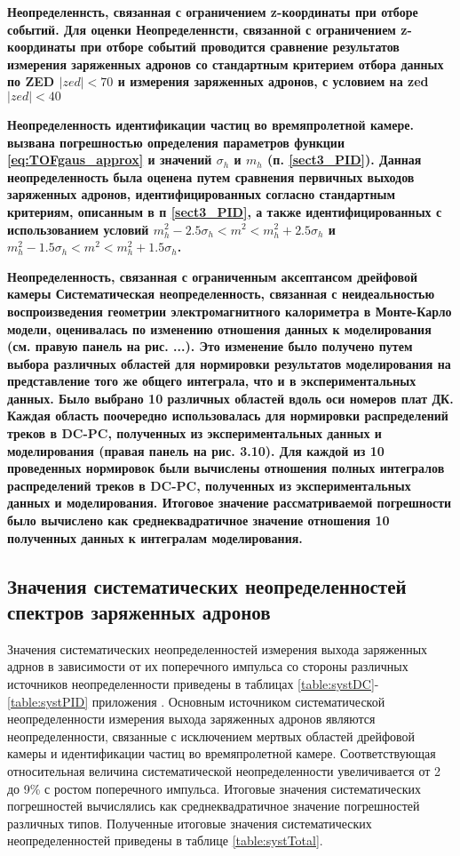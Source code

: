 \bfseries Неопределеннсть, связанная с ограничением z-координаты при отборе событий. 
\mdseries
Для оценки Неопределеннсти, связанной с ограничением z-координаты при отборе событий проводится сравнение результатов измерения заряженных адронов со стандартным критерием отбора данных по ZED $|zed|<70$ и измерения заряженных адронов, с условием на zed $|zed|<40$ 

\bfseries Неопределенность идентификации частиц во времяпролетной камере.
\mdseries
вызвана погрешностью определения параметров функции \ref{eq:TOFgaus_approx} и значений  $\sigma_h$ и $m_h$ (п. \ref{sect3_PID}). Данная неопределенность была оценена путем сравнения первичных выходов заряженных адронов, идентифицированных согласно стандартным критериям, описанным в п \ref{sect3_PID}, а также идентифицированных с использованием условий $ m^2_h -2.5\sigma_h < m^2 < m^2_h +2.5\sigma_h $ и  $ m^2_h -1.5\sigma_h < m^2 < m^2_h +1.5\sigma_h $.

\bfseries Неопределенность, связанная с ограниченным аксептансом дрейфовой камеры
\mdseries
Систематическая неопределенность, связанная с неидеальностью воспроизведения геометрии электромагнитного калориметра в Монте-Карло модели, оценивалась по изменению отношения данных к моделирования (см. правую панель на рис. ...). Это изменение было получено путем выбора различных областей для нормировки результатов моделирования на представление того же
общего интеграла, что и в экспериментальных данных. Было выбрано 10 различных областей вдоль оси номеров плат ДК. Каждая область поочередно использовалась для нормировки распределений треков в DC-PC, полученных из экспериментальных данных и моделирования (правая панель на рис. 3.10). Для каждой из 10 проведенных нормировок были вычислены отношения полных интегралов распределений треков в DC-PC, полученных из экспериментальных данных и моделирования. Итоговое значение рассматриваемой погрешности было вычислено как среднеквадратичное значение отношения 10 полученных данных к интегралам моделирования. 

\subsection{Значения систематических неопределенностей спектров заряженных адронов} \label{sect3:SystValues}
Значения систематических неопределенностей измерения выхода заряженных адрнов в зависимости от их поперечного импульса со стороны различных источников неопределенности приведены в таблицах \ref{table:systDC}-\ref{table:systPID} приложения \label{AppendixA}. Основным источником систематической неопределенности измерения выхода заряженных адронов являются неопределенности, связанные с исключением мертвых областей дрейфовой камеры и идентификации частиц во времяпролетной камере. Соответствующая относительная величина систематической неопределенности увеличивается от 2 до 9\% с ростом поперечного импульса. 
Итоговые значения систематических погрешностей вычислялись как среднеквадратичное значение погрешностей различных типов. Полученные итоговые значения систематических неопределенностей приведены в таблице \ref{table:systTotal}.

